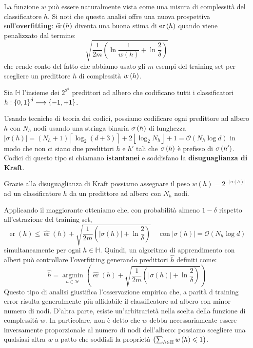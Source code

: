 \documentclass[\main/main.tex]{subfiles}
\begin{document}
\begin{observation}
    La funzione \(w\) può essere naturalmente vista come una misura di complessità del classificatore \(h\). Si noti che questa analisi offre una nuova prospettiva sull'\textbf{overfitting}: \(\widehat{\text{er}}\left(h\right)\) diventa una buona stima di \(\text{er}\left(h\right)\) quando viene penalizzato dal termine:
    \[
        \sqrt{\frac{1}{2 m}\left(\ln \frac{1}{w(h)}+\ln \frac{2}{\delta}\right)}
    \]
    che rende conto del fatto che abbiamo usato gli \(m\) esempi del training set per scegliere un predittore \(h\) di complessità \(w\left(h\right)\).
\end{observation}
\begin{example}
    Sia \(\mathbb{H}\) l'insieme dei \(2^{2^d}\) predittori ad albero che codificano tutti i classificatori \(h:\left\{0,1\right\}^d\longrightarrow \left\{-1, +1\right\}\).
    \begin{multicols}{2}
        Usando tecniche di teoria dei codici, possiamo codificare ogni predittore ad albero \(h\) con \(N_h\) nodi usando una stringa binaria \(\sigma\left(h\right)\) di lunghezza \(|\sigma(h)|=\left(N_{h}+1\right)\left\lceil\log _{2}(d+3)\right\rceil+ 2\left\lfloor\log _{2} N_{h}\right\rfloor+ 1=\mathcal{O}\left(N_{h} \log d\right)\) in modo che non ci siano due predittori \(h\) e \(h'\) tali che \(\sigma\left(h\right)\) è prefisso di \(\sigma\left(h'\right)\). Codici di questo tipo si chiamano \textbf{istantanei} e soddisfano la \textbf{disuguaglianza di Kraft}.
    
        Grazie alla disuguaglianza di Kraft possiamo assegnare il peso \(w(h)=2^{-|\sigma(h)|}\) ad un classificatore \(h\) da un predittore ad albero con \(N_h\) nodi.
        
        Applicando il maggiorante otteniamo che, con probabilità almeno \(1-\delta\) rispetto all'estrazione del training set,
        \[
            \operatorname{er}(h) \leq \widehat{\operatorname{er}}(h)+\sqrt{\frac{1}{2 m}\left(|\sigma(h)|+\ln \frac{2}{\delta}\right)} \quad \operatorname{con}|\sigma(h)|=\mathcal{O}\left(N_{h} \log d\right)
        \]
        simultaneamente per ogni \(h \in \mathbb{H}\). Quindi, un algoritmo di apprendimento con alberi può controllare l'overfitting generando predittori \(\hat{h}\) definiti come:
        \[
            \widehat{h}=\underset{h \in \mathcal{H}}{\operatorname{argmin}}\left(\widehat{\operatorname{er}}(h)+\sqrt{\frac{1}{2 m}\left(|\sigma(h)|+\ln \frac{2}{\delta}\right)}\right)
        \]
        Questo tipo di analisi giustifica l'osservazione empirica che, a parità d training error risulta generalmente più affidabile il classificatore ad albero con minor numero di nodi. D'altra parte, esiste un'arbitrarietà nella scelta della funzione di complessità \(w\). In particolare, non è detto che \(w\) debba necessariamente essere inversamente proporzionale al numero di nodi dell'albero: possiamo scegliere una qualsiasi altra \(w\) a patto che soddisfi la proprietà \(\left(\sum_{h \in \mathbb{H}} w\left(h\right) \leqslant 1\right)\). 
        

\end{multicols}
\end{example}
\end{document}
